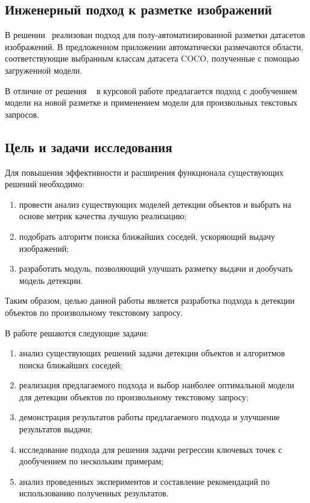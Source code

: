 \documentclass[a4paper,14pt]{article}
\begin{document}

    \subsection{Инженерный подход к разметке изображений}

    В решении~\cite{AnnoMage} реализован подход для полу-автоматизированной разметки датасетов изображений.
    В предложенном приложении автоматически размечаются области, соответствующие выбранным классам датасета COCO, полученные с помощью загруженной модели.

    В отличие от решения ~\cite{AnnoMage} в курсовой работе предлагается подход с дообучением модели на новой разметке и применением модели для произвольных текстовых запросов.

    \subsection{Цель и задачи исследования}
    
    Для повышения эффективности и расширения функционала существующих решений необходимо:
    \begin{enumerate}
    	[1)]
    	\itemsep0em
    	\item провести анализ существующих моделей детекции объектов и выбрать на основе метрик качества лучшую реализацию;
    	\item подобрать алгоритм поиска ближайших соседей, ускоряющий выдачу изображений;
    	\item разработать модуль, позволяющий улучшать разметку выдачи и дообучать модель детекции.
    \end{enumerate}
    
    Таким образом, целью данной работы является разработка подхода к детекции объектов по произвольному текстовому запросу.

    В работе решаются следующие задачи:
    \begin{enumerate}
        [1)]
        \itemsep0em
        \item анализ существующих решений задачи детекции объектов и алгоритмов поиска ближайших соседей;
        \item реализация предлагаемого подхода и выбор наиболее оптимальной модели для детекции объектов по произвольному текстовому запросу;
        \item демонстрация результатов работы предлагаемого подхода и улучшение результатов выдачи;
        \item исследование подхода для решения задачи регрессии ключевых точек с дообучением по нескольким примерам;
        \item анализ проведенных экспериментов и составление рекомендаций по использованию полученных результатов.
    \end{enumerate}
\end{document}
